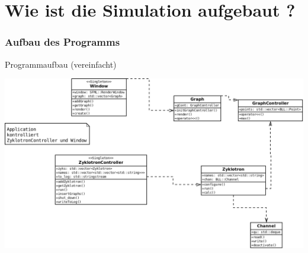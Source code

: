 \documentclass{beamer}
\begin{document}
\section{Wie ist die Simulation aufgebaut ?}
\frame{\tableofcontents[currentsection]}


\begin{frame}
\frametitle{Aufbau des Programms}
\begin{block}{Programmaufbau (vereinfacht)}
\begin{center}
  \includegraphics[width=\textwidth]{praes/ProgrammAufbauVereinfacht.png}
\end{center}
\end{block}
\end{frame}
\end{document}
